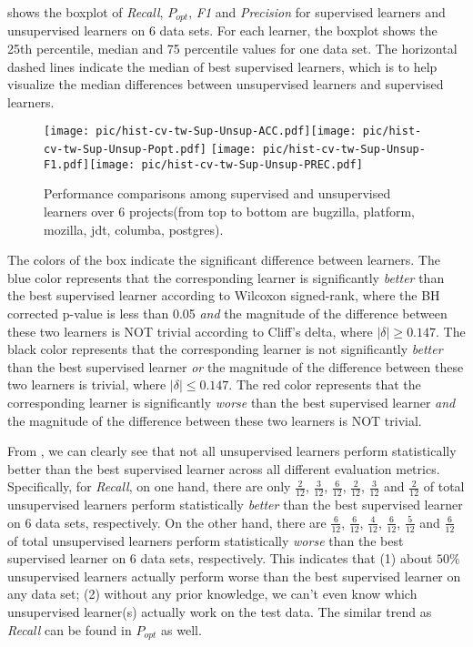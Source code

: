  shows the boxplot of {\it Recall}, {\it $P_{opt}$}, {\it F1} and {\it Precision} for
supervised learners and unsupervised learners on 6 data sets. For each learner, the boxplot shows the
25th percentile, median and 75 percentile  values for one data set. The horizontal dashed lines indicate
the median of best supervised learners, which is to help visualize the median differences between unsupervised
learners and supervised learners.  


\begin{figure*}[!htbp]
\begin{center}
    \texttt{[image: pic/hist-cv-tw-Sup-Unsup-ACC.pdf]}\texttt{[image: pic/hist-cv-tw-Sup-Unsup-Popt.pdf]}
    \texttt{[image: pic/hist-cv-tw-Sup-Unsup-F1.pdf]}\texttt{[image: pic/hist-cv-tw-Sup-Unsup-PREC.pdf]}
\caption{Performance comparisons among supervised and unsupervised learners over 6 projects(from top to bottom are  bugzilla, platform, mozilla, jdt, columba, postgres). } 
\label{fig:sup_unsup}
\end{center}
\end{figure*}

The colors of the box indicate
the significant difference between learners. The blue color represents that the corresponding learner
is significantly {\it better} than the best supervised learner according to Wilcoxon signed-rank, where the
BH corrected p-value is less than 0.05 {\it and} the magnitude of the difference between these two learners is NOT trivial
according to Cliff's delta, where $|\delta| \geq 0.147$. The black color represents that the corresponding learner is not significantly {\it better} than the best supervised learner {\it or} the magnitude of the difference between these two learners is trivial, where $|\delta| \leq 0.147$. The red color represents that the corresponding learner is significantly {\it worse} than the best supervised learner {\it and} the  magnitude of the difference between these two learners is NOT trivial.

From ,  we can clearly see that not all unsupervised
learners perform statistically better than the best supervised learner
across all different evaluation metrics. Specifically, for {\it Recall}, 
on one hand, there are only $\frac{2}{12}$,
$\frac{3}{12}$, $\frac{6}{12}$, $\frac{2}{12}$, $\frac{3}{12}$ and $\frac{2}{12}$ of
total unsupervised learners perform statistically {\it better} than
the best supervised learner on 6 data sets, respectively.
On the other hand, there are $\frac{6}{12}$, $\frac{6}{12}$, $\frac{4}{12}$, $\frac{6}{12}$,
$\frac{5}{12}$ and $\frac{6}{12}$ of
total unsupervised learners perform statistically {\it worse} than the best supervised learner on 6 data sets, respectively. This indicates that (1) about $50\%$ unsupervised learners actually 
perform worse than the best supervised learner on any data set;
(2) without any prior knowledge,  we can't even know which
unsupervised learner(s) actually work on the test data. The similar trend as {\it Recall}
can be found in $ P_{opt}$ as well.


